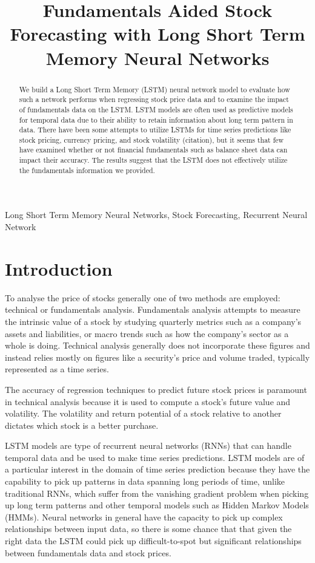 \documentclass{article}
\title{Fundamentals Aided Stock Forecasting with Long Short Term Memory Neural Networks}
\begin{document}
%
\maketitle
%
\begin{abstract}
We build a Long Short Term Memory (LSTM) neural network model to evaluate how such a network performs when regressing stock price data and to examine the impact of fundamentals data on the LSTM. LSTM models are often used as predictive models for temporal data due to their ability to retain information about long term pattern in data. There have been some attempts to utilize LSTMs for time series predictions like stock pricing, currency pricing, and stock volatility (citation), but it seems that few have examined whether or not financial fundamentals such as balance sheet data can impact their accuracy. The results suggest that the LSTM does not effectively utilize the fundamentals information we provided.
\end{abstract}
%
\begin{keywords}
Long Short Term Memory Neural Networks, Stock Forecasting, Recurrent Neural Network
\end{keywords}
%
\section{Introduction}
\label{sec:intro}

To analyse the price of stocks generally one of two methods are employed: technical or fundamentals analysis. Fundamentals analysis attempts to measure the intrinsic value of a stock by studying quarterly metrics such as a company’s assets and liabilities, or macro trends such as how the company’s sector as a whole is doing.  Technical analysis generally does not incorporate these figures and instead relies mostly on figures like a security’s price and volume traded, typically represented as a time series. 

The accuracy of regression techniques to predict future stock prices is paramount in technical analysis because it is used to compute a stock's future value and volatility. The volatility and return potential of a stock relative to another dictates which stock is a better purchase.

LSTM models are type of recurrent neural networks (RNNs) that can handle temporal data and be used to make time series predictions. LSTM models are of a particular interest in the domain of time series prediction because they have the capability to pick up patterns in data spanning long periods of time, unlike traditional RNNs, which suffer from the vanishing gradient problem when picking up long term patterns and other temporal models such as Hidden Markov Models (HMMs). Neural networks in general have the capacity to pick up complex relationships between input data, so there is some chance that that given the right data the LSTM could pick up difficult-to-spot but significant relationships between fundamentals data and stock prices.  
\end{document}
